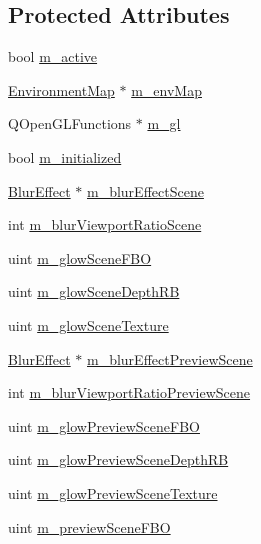 \subsection*{Protected Attributes}
\begin{DoxyCompactItemize}
\item 
bool \hyperlink{class_painter_a9b476c949ca4b2af7b1653c7106b659b}{m\+\_\+active}
\item 
\hyperlink{class_environment_map}{Environment\+Map} $\ast$ \hyperlink{class_painter_acb7b623817cf6865168bb74d3823897f}{m\+\_\+env\+Map}
\item 
Q\+Open\+G\+L\+Functions $\ast$ \hyperlink{class_painter_a8aa44a5f1477d570ee10d3dacae09f08}{m\+\_\+gl}
\item 
bool \hyperlink{class_painter_a0adcfafb8172b4f76561e2c951b1090b}{m\+\_\+initialized}
\item 
\hyperlink{class_blur_effect}{Blur\+Effect} $\ast$ \hyperlink{class_painter_a951961fa0e012d87500b9775f9dcb19a}{m\+\_\+blur\+Effect\+Scene}
\item 
int \hyperlink{class_painter_a9a58327bf0fd8004e11e97c4415caa62}{m\+\_\+blur\+Viewport\+Ratio\+Scene}
\item 
uint \hyperlink{class_painter_a265ca037babf5497830eda6f42b6aeef}{m\+\_\+glow\+Scene\+F\+B\+O}
\item 
uint \hyperlink{class_painter_af165f6cb73abce18d3c48e4cbba39058}{m\+\_\+glow\+Scene\+Depth\+R\+B}
\item 
uint \hyperlink{class_painter_ab0b0d6b22e49da1a22d3e3114efc6f56}{m\+\_\+glow\+Scene\+Texture}
\item 
\hyperlink{class_blur_effect}{Blur\+Effect} $\ast$ \hyperlink{class_painter_a8960c588485d1ccdb7d4306236e187af}{m\+\_\+blur\+Effect\+Preview\+Scene}
\item 
int \hyperlink{class_painter_ab898af5b9784a08a86a93d9d9f3e6de6}{m\+\_\+blur\+Viewport\+Ratio\+Preview\+Scene}
\item 
uint \hyperlink{class_painter_a68a674089abe95f55b48e12fef4e3a8f}{m\+\_\+glow\+Preview\+Scene\+F\+B\+O}
\item 
uint \hyperlink{class_painter_ae7d26057c7ce98d20f8e11242f9b8d23}{m\+\_\+glow\+Preview\+Scene\+Depth\+R\+B}
\item 
uint \hyperlink{class_painter_a642492c18262a53f20c0824bd70e7526}{m\+\_\+glow\+Preview\+Scene\+Texture}
\item 
uint \hyperlink{class_painter_adb6ae15aabf53d3f2c9108a8db0cbbb5}{m\+\_\+preview\+Scene\+F\+B\+O}
\item 

\end{DoxyCompactItemize}

